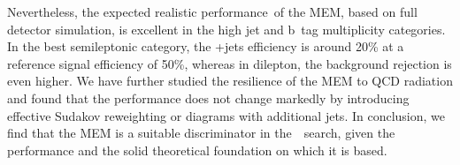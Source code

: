 Nevertheless, the expected realistic performance of the MEM, based on full detector simulation, is excellent in the high jet and b~tag multiplicity categories. In the best semileptonic category, the \ttbar+jets efficiency is around 20\% at a reference signal efficiency of 50\%, whereas in dilepton, the background rejection is even higher. We have further studied the resilience of the MEM to QCD radiation and found that the performance does not change markedly by introducing effective Sudakov reweighting or diagrams with additional jets. In conclusion, we find that the MEM is a suitable discriminator in the~\ttHbb~search, given the performance and the solid theoretical foundation on which it is based.
